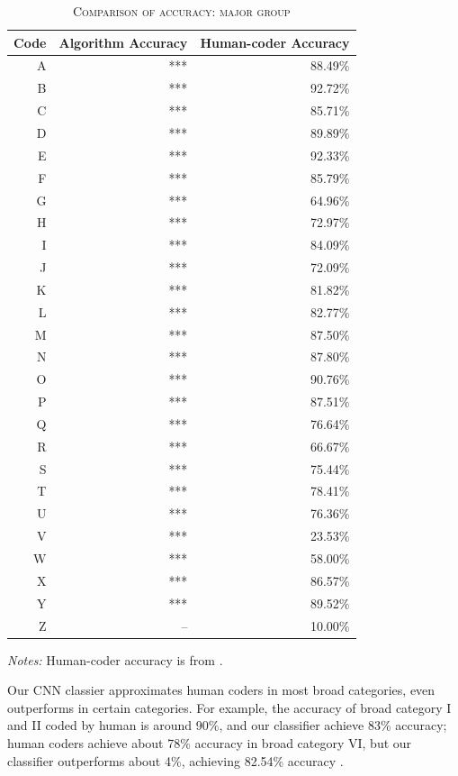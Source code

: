 \documentclass[11pt]{article}
\begin{document}
\begin{table}
\centering
\begin{threeparttable}
    \caption{\textsc{Comparison of accuracy: major group}} \label{tab:acc_mg}
    \begin{tabular}{r|r|r}
		\hline
			Code & Algorithm Accuracy & Human-coder Accuracy \\
		\hline
		A & *** & 88.49\% \\
		B & *** & 92.72\% \\
		C & *** & 85.71\% \\
		D & *** & 89.89\% \\
		E & *** & 92.33\% \\
		F & *** & 85.79\% \\
		G & *** & 64.96\% \\
		H & *** & 72.97\% \\
		I & *** & 84.09\% \\
		J & *** & 72.09\% \\
		K & *** & 81.82\% \\
		L & *** & 82.77\% \\
		M & *** & 87.50\% \\
		N & *** & 87.80\% \\
		O & *** & 90.76\% \\
		P & *** & 87.51\% \\
		Q & *** & 76.64\% \\
		R & *** & 66.67\% \\
		S & *** & 75.44\% \\
		T & *** & 78.41\% \\
		U & *** & 76.36\% \\
		V & *** & 23.53\% \\
		W & *** & 58.00\% \\
		X & *** & 86.57\% \\
		Y & *** & 89.52\% \\
		Z & -- & 10.00\% \\
         \hline
    \end{tabular}
\begin{tablenotes}
\footnotesize
\item \emph{Notes:} Human-coder accuracy is from \textcite{StengelGettingItRight1998}.
\end{tablenotes}
\end{threeparttable}
\end{table}


Our CNN classier approximates human coders in most broad categories, even outperforms in certain categories. For example, the accuracy of broad category I and II coded by human is around 90\%, and our classifier achieve 83\% accuracy; human coders achieve about 78\% accuracy in broad category VI, but our classifier outperforms about 4\%, achieving 82.54\% accuracy \textcite[153]{StengelGettingItRight1998}.



\sloppy
\printbibliography
\end{document}
